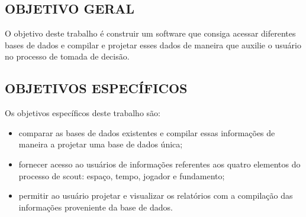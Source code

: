 \subsection{OBJETIVO GERAL}
O objetivo deste trabalho é construir um software que consiga acessar diferentes bases de dados e compilar e projetar esses dados de maneira que auxilie o usuário no processo de tomada de decisão.

\subsection{OBJETIVOS ESPECÍFICOS}
Os objetivos específicos deste trabalho são:
\begin{itemize}
	\item  comparar as bases de dados existentes e compilar essas informações de maneira a projetar uma base de dados única;
	\item fornecer acesso ao usuários de informações referentes aos quatro elementos do processo de scout: espaço, tempo, jogador e fundamento;
	\item permitir ao usuário projetar e visualizar os relatórios com a compilação das informações proveniente da base de dados.
\end{itemize}